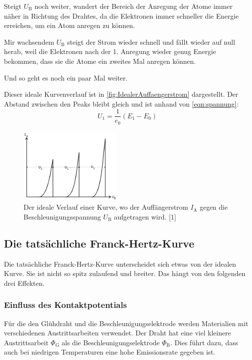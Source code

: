 \documentclass[titlepage = firstcover]{scrartcl}
\begin{document}
            Steigt $U_{\text{B}}$ noch weiter, wandert der Bereich der Anregung der Atome immer näher in Richtung des Drahtes, da die Elektronen immer schneller die Energie erreichen, um ein Atom anregen zu können.

            Mir wachsendem $U_{\text{B}}$ steigt der Strom wieder schnell und fällt wieder auf null herab, weil die Elektronen nach der 1. Anregung wieder genug Energie bekommen, dass sie die Atome ein zweites Mal anregen können.

            Und so geht es noch ein paar Mal weiter.

            Dieser ideale Kurvenverlauf ist in \autoref{fig:IdealerAuffaengerstrom} dargestellt. Der Abstand zwischen den Peaks bleibt gleich und ist anhand von \autoref{eqn:spannung}:
            \begin{equation*}
                U_{1} = \frac{1}{e_0}(E_1 - E_0)
            \end{equation*}

            \begin{figure}[h]
                \centering
                \includegraphics[width = 0.45\textwidth]{Bilder/IdealerAuffaengerstrom.png}
                \caption{Der ideale Verlauf einer Kurve, wo der Auffängerstrom $I_{\text{A}}$ gegen die Beschleunigungsspannung $U_{\text{B}}$ aufgetragen wird. [1]}
                \label{fig:IdealerAuffaengerstrom}
            \end{figure}

            \FloatBarrier

        \subsection{Die tatsächliche Franck-Hertz-Kurve}
            Die tatsächliche Franck-Hertz-Kurve unterscheidet sich etwas von der idealen Kurve. Sie ist nicht so spitz zulaufend und breiter. Das hängt von den folgenden drei Effekten.
            \subsubsection{Einfluss des Kontaktpotentials}
                Für die den Glühdraht und die Beschleunigungselektrode werden Materialien mit verschiedenen Austrittsarbeiten verwendet.
                Der Draht hat eine viel kleinere Austrittsarbeit $\Phi_{\text{G}}$ als die Beschleunigungselektrode $\Phi_{\text{B}}$. Dies führt dazu, dass auch bei niedrigen Temperaturen eine hohe Emissionsrate gegeben ist. 
                
\end{document}
